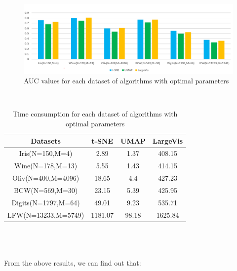 \begin{figure}[ht]

\centering
\includegraphics[width=12cm,height=5cm\textwidth]{images/conclusion/AUC_result.PNG}
\caption{AUC values for each dataset of algorithms with optimal parameters}
\label{fig:label}
\end{figure}\\

\begin{table}[h]  %
\centering  %
 \begin{tabular}{|c|c|c|c|}  %
     \hline
       Datasets & t-SNE & UMAP & LargeVis\\
       [0.5ex]  %
      
        \hline  %
        Iris(N=150,M=4) & 2.89 & 1.37 & 408.15\\
        \hline  %
        Wine(N=178,M=13) & 5.55 & 1.43 & 414.15\\
        \hline  %
        Oliv(N=400,M=4096) & 18.65 & 4.4 & 427.23\\
        \hline  %
        BCW(N=569,M=30) & 23.15 & 5.39 & 425.95\\
        \hline  %
        Digits(N=1797,M=64) & 49.01 & 9.23 & 535.71\\
        \hline  %
        LFW(N=13233,M=5749) & 1181.07 & 98.18 & 1625.84\\
       \hline
   \end{tabular}
   \caption{Time consumption for each dataset of algorithms with optimal parameters} 
\end{table}\\
\\
\\
\noindent From the above results, we can find out that:\\

